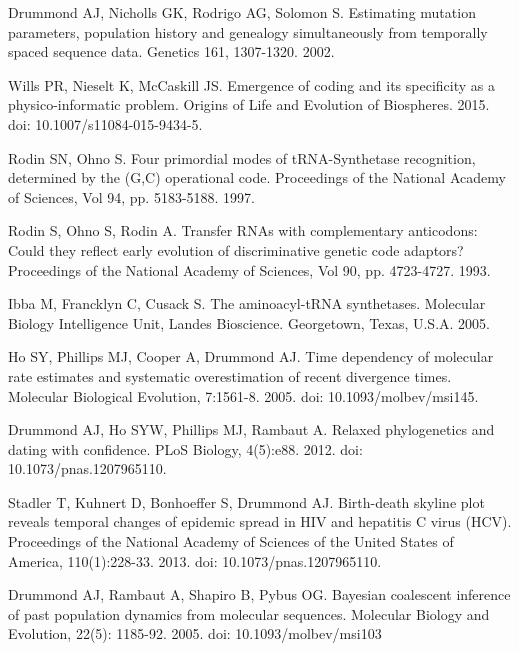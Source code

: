 \documentclass[10pt,letterpaper]{article}
\begin{document}
\begin{thebibliography}{10}
Drummond AJ, Nicholls GK, Rodrigo AG, Solomon S. 
\newblock Estimating mutation parameters, population history and genealogy simultaneously from temporally spaced sequence data.
\newblock Genetics 161, 1307-1320. 2002.

Wills PR, Nieselt K, McCaskill JS.
\newblock Emergence of coding and its specificity as a physico-informatic problem.
\newblock Origins of Life and Evolution of Biospheres. 2015. doi: 10.1007/s11084-015-9434-5.

Rodin SN, Ohno S.
\newblock Four primordial modes of tRNA-Synthetase recognition, determined by the (G,C) operational code.
\newblock Proceedings of the National Academy of Sciences, Vol 94, pp. 5183-5188. 1997.

Rodin S, Ohno S, Rodin A.
\newblock Transfer RNAs with complementary anticodons: Could they reflect early evolution of discriminative genetic code adaptors?
\newblock Proceedings of the National Academy of Sciences, Vol 90, pp. 4723-4727. 1993.

Ibba M, Francklyn C, Cusack S.
\newblock The aminoacyl-tRNA synthetases.
\newblock Molecular Biology Intelligence Unit, Landes Bioscience. Georgetown, Texas, U.S.A. 2005.

Ho SY, Phillips MJ, Cooper A, Drummond AJ.
\newblock Time dependency of molecular rate estimates and systematic overestimation of recent divergence times.
\newblock Molecular Biological Evolution, 7:1561-8. 2005. doi: 10.1093/molbev/msi145.

Drummond AJ, Ho SYW, Phillips MJ, Rambaut A.
\newblock Relaxed phylogenetics and dating with confidence.
\newblock PLoS Biology, 4(5):e88. 2012. doi: 10.1073/pnas.1207965110.

Stadler T, Kuhnert D, Bonhoeffer S, Drummond AJ.
\newblock Birth-death skyline plot reveals temporal changes of epidemic spread in HIV and hepatitis C virus (HCV).
\newblock Proceedings of the National Academy of Sciences of the United States of America, 110(1):228-33. 2013. doi: 10.1073/pnas.1207965110.

Drummond AJ, Rambaut A, Shapiro B, Pybus OG.
\newblock Bayesian coalescent inference of past population dynamics from molecular sequences.
\newblock Molecular Biology and Evolution, 22(5): 1185-92. 2005. doi: 10.1093/molbev/msi103


\end{thebibliography}
\end{document}
